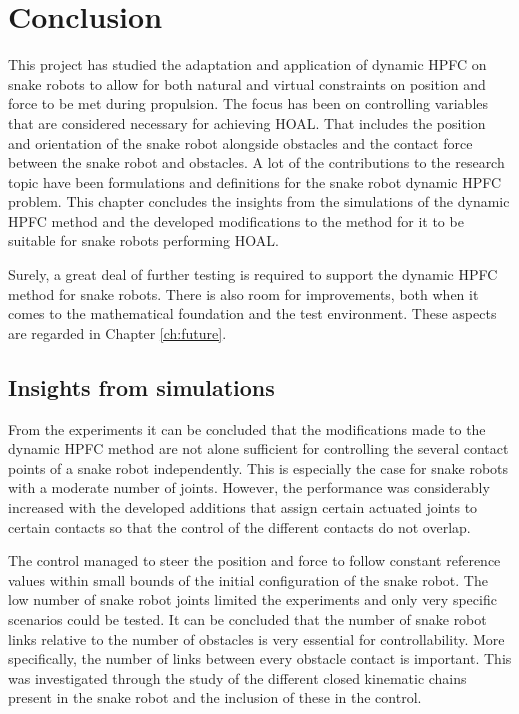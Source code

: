 \chapter{Conclusion}\label{ch:conclusion}

This project has studied the adaptation and application of dynamic HPFC on snake robots to allow for both natural and virtual constraints on position and force to be met during propulsion. The focus has been on controlling variables that are considered necessary for achieving HOAL. That includes the position and orientation of the snake robot alongside obstacles and the contact force between the snake robot and obstacles. A lot of the contributions to the research topic have been formulations and definitions for the snake robot dynamic HPFC problem. This chapter concludes the insights from the simulations of the dynamic HPFC method and the developed modifications to the method for it to be suitable for snake robots performing HOAL.

Surely, a great deal of further testing is required to support the dynamic HPFC method for snake robots. There is also room for improvements, both when it comes to the mathematical foundation and the test environment. These aspects are regarded in Chapter \ref{ch:future}.

\section{Insights from simulations}

From the experiments it can be concluded that the modifications made to the dynamic HPFC method are not alone sufficient for controlling the several contact points of a snake robot independently. This is especially the case for snake robots with a moderate number of joints. However, the performance was considerably increased with the developed additions that assign certain actuated joints to certain contacts so that the control of the different contacts do not overlap.


The control managed to steer the position and force to follow constant reference values within small bounds of the initial configuration of the snake robot. The low number of snake robot joints limited the experiments and only very specific scenarios could be tested. It can be concluded that the number of snake robot links relative to the number of obstacles is very essential for controllability. More specifically, the number of links between every obstacle contact is important. This was investigated through the study of the different closed kinematic chains present in the snake robot and the inclusion of these in the control.

